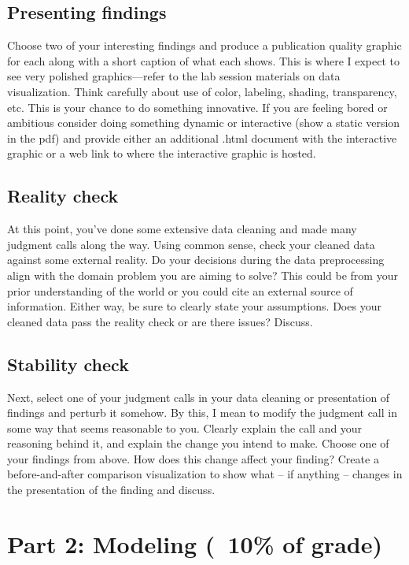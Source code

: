 \documentclass[10pt,letterpaper]{article}
\begin{document}
\subsection*{Presenting findings}

Choose two of your interesting findings and produce a publication quality graphic for each along with a short caption of what each shows. This is where I expect to see very polished graphics---refer to the lab session materials on data visualization. Think carefully about use of color, labeling, shading, transparency, etc. This is your chance to do something innovative. If you are feeling bored or ambitious consider doing something dynamic or interactive (show a static version in the pdf) and provide either an additional .html document with the interactive graphic or a web link to where the interactive graphic is hosted.

\subsection*{Reality check}

At this point, you’ve done some extensive data cleaning and made many judgment calls along the way. Using common sense, check your cleaned data against some external reality. Do your decisions during the data preprocessing align with the domain problem you are aiming to solve? This could be from your prior understanding of the world or you could cite an external source of information. Either way, be sure to clearly state your assumptions. Does your cleaned data pass the reality check or are there issues? Discuss.

\subsection*{Stability check}

Next, select one of your judgment calls in your data cleaning or presentation of findings and perturb it somehow. By this, I mean to modify the judgment call in some way that seems reasonable to you. Clearly explain the call and your reasoning behind it, and explain the change you intend to make. Choose one of your findings from above. How does this change affect your finding? Create a before-and-after comparison visualization to show what – if anything – changes in the presentation of the finding and discuss.

\section*{Part 2: Modeling (~10\% of grade)}
\end{document}
